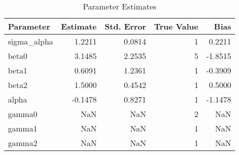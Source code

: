\begin{table}
\caption{Parameter Estimates}
\begin{tabular}{lrrrr}
\toprule
Parameter & Estimate & Std. Error & True Value & Bias \\
\midrule
sigma_alpha & 1.2211 & 0.0814 & 1 & 0.2211 \\
beta0 & 3.1485 & 2.2535 & 5 & -1.8515 \\
beta1 & 0.6091 & 1.2361 & 1 & -0.3909 \\
beta2 & 1.5000 & 0.4542 & 1 & 0.5000 \\
alpha & -0.1478 & 0.8271 & 1 & -1.1478 \\
gamma0 & NaN & NaN & 2 & NaN \\
gamma1 & NaN & NaN & 1 & NaN \\
gamma2 & NaN & NaN & 1 & NaN \\
\bottomrule
\end{tabular}
\end{table}
